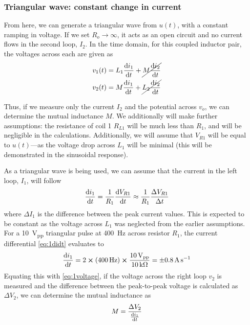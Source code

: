 \documentclass{report}
\newcommand{\pp}{_{pp}}
\newcommand{\Vpp}{\V\pp}
\begin{document}
\subsubsection{Triangular wave: constant change in current}
From here, we can generate a triangular wave from $u(t)$, with a constant ramping in voltage. If we set $R_o \to \infty$, it acts as an open circuit and no current flows in the second loop, $I_2$.
In the time domain, for this coupled inductor pair, the voltages across each are given as
\begin{subequations}
	\label{eq:1voltages}
	\begin{align}
		v_1(t) & = L_1 \dv{i_1}{t} + \cancel{M \dv{i_2}{t}} \\
		v_2(t) & = M \dv{i_1}{t} + \cancel{L_2 \dv{i_2}{t}} \label{eq:1voltage}
	\end{align}
\end{subequations}

Thus, if we measure only the current $I_2$ and the potential across $v_o$, we can determine the mutual inductance $M$. We additionally will make further assumptions: the resistance of coil 1 $R_{L1}$ will be much less than $R_1$, and will be negligible in the calculations. Additionally, we will assume that $V_{R1}$ will be equal to $u(t)$---as the voltage drop across $L_1$ will be minimal (this will be demonstrated in the sinusoidal response).

As a triangular wave is being used, we can assume that the current in the left loop, $I_1$, will follow 
\begin{equation}
	\dv{i_1}{t} = \frac{1}{R_1} \dv{V_{R1}}{t} \approx \frac{1}{R_1} \frac{\Delta V_{R1}}{\Delta t} \label{eq:1didt}
\end{equation}
where $\Delta I_1$ is the difference between the peak current values. This is expected to be constant as the voltage across $L_1$ was neglected from the earlier assumptions.
For a \SI{10}{\Vpp} triangular pulse at \SI{400}{\Hz} across resistor $R_1$, the current differential \eqref{eq:1didt} evaluates to \begin{equation}
	\dv{i_1}{t} = 2 \cross (\SI{400}{\Hz}) \cross \frac{\SI{10}{\Vpp}}{\SI{10}{\kohm}} = \pm \SI{0.8}{\A\per\s}
\end{equation}
Equating this with \eqref{eq:1voltage}, if the voltage across the right loop $v_2$ is measured and the difference between the peak-to-peak voltage is calculated as $\Delta V_2$, we can determine the mutual inductance as 
\begin{equation}
	M = \frac{\Delta V_2}{\dv{i_1}{t}} \label{eq:mtriangle} %
\end{equation}
\end{document}
